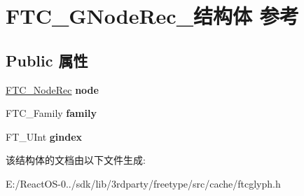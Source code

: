 \hypertarget{struct_f_t_c___g_node_rec__}{}\section{F\+T\+C\+\_\+\+G\+Node\+Rec\+\_\+结构体 参考}
\label{struct_f_t_c___g_node_rec__}
\subsection*{Public 属性}
\begin{DoxyCompactItemize}
\item 
\mbox{\label{struct_f_t_c___g_node_rec___a53b5fa8e2c17e423cfe4642752e8ed2a}} 
\hyperlink{struct_f_t_c___node_rec__}{F\+T\+C\+\_\+\+Node\+Rec} {\bfseries node}
\item 
\mbox{\label{struct_f_t_c___g_node_rec___af71af3f57ab54120304825f6d324eefe}} 
F\+T\+C\+\_\+\+Family {\bfseries family}
\item 
\mbox{\label{struct_f_t_c___g_node_rec___a15e4cebdeb65eb5267fc05af15705d0a}} 
F\+T\+\_\+\+U\+Int {\bfseries gindex}
\end{DoxyCompactItemize}


该结构体的文档由以下文件生成\+:\begin{DoxyCompactItemize}
\item 
E\+:/\+React\+O\+S-\/0../sdk/lib/3rdparty/freetype/src/cache/ftcglyph.\+h\end{DoxyCompactItemize}
